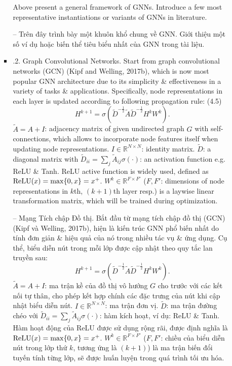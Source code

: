 \documentclass{article}
\begin{document}
\begin{itemize}
\begin{itemize}
\begin{itemize}
            Above present a general framework of GNNs. Introduce a few most representative instantiations or variants of GNNs in literature.

            -- Trên đây trình bày một khuôn khổ chung về GNN. Giới thiệu một số ví dụ hoặc biến thể tiêu biểu nhất của GNN trong tài liệu.
            \item {.2. Graph Convolutional Networks.} Start from graph convolutional networks (GCN) (Kipf and Welling, 2017b), which is now most popular GNN architecture due to its simplicity \& effectiveness in a variety of tasks \& applications. Specifically, node representations in each layer is updated according to following propagation rule: (4.5)
            \begin{equation*}
                H^{k+1} = \sigma(\tilde{D}^{-\frac{1}{2}}\tilde{A}\tilde{D}^{-\frac{1}{2}}H^kW^k).
            \end{equation*}
            $\tilde{A} = A + I$: adjacency matrix of given undirected graph $G$ with self-connections, which allows to incorporate node features itself when updating node representations. $I\in\mathbb{R}^{N\times N}$: identity matrix. $\tilde{D}$: a diagonal matrix with $\tilde{D}_{ii} = \sum_j \tilde{A}_{ij}\sigma(\cdot)$: an activation function e.g. ReLU \& Tanh. ReLU active function is widely used, defined as ${\rm ReLU}(x) = \max\{0,x\} = x^+$. $W^k\in\mathbb{R}^{F\times F'}$ ($F,F'$: dimensions of node representations in $k$th, $(k + 1)$th layer resp.) is a laywise linear transformation matrix, which will be trained during optimization.

            -- {\sf Mạng Tích chập Đồ thị.} Bắt đầu từ mạng tích chập đồ thị (GCN) (Kipf và Welling, 2017b), hiện là kiến trúc GNN phổ biến nhất do tính đơn giản \& hiệu quả của nó trong nhiều tác vụ \& ứng dụng. Cụ thể, biểu diễn nút trong mỗi lớp được cập nhật theo quy tắc lan truyền sau:
            \begin{equation*}
                H^{k+1} = \sigma(\tilde{D}^{-\frac{1}{2}}\tilde{A}\tilde{D}^{-\frac{1}{2}}H^kW^k).
            \end{equation*}
            $\tilde{A} = A + I$: ma trận kề của đồ thị vô hướng $G$ cho trước với các kết nối tự thân, cho phép kết hợp chính các đặc trưng của nút khi cập nhật biểu diễn nút. $I\in\mathbb{R}^{N\times N}$: ma trận đơn vị. $\tilde{D}$: ma trận đường chéo với $\tilde{D}_{ii} = \sum_j \tilde{A}_{ij}\sigma(\cdot)$: hàm kích hoạt, ví dụ: ReLU \& Tanh. Hàm hoạt động của ReLU được sử dụng rộng rãi, được định nghĩa là ${\rm ReLU}(x) = \max\{0,x\} = x^+$. $W^k\in\mathbb{R}^{F\times F'}$ ($F,F'$: chiều của biểu diễn nút trong lớp thứ $k$, tương ứng là $(k + 1)$) là ma trận biến đổi tuyến tính từng lớp, sẽ được huấn luyện trong quá trình tối ưu hóa.


\end{itemize}
\end{itemize}
\end{itemize}
\end{document}
